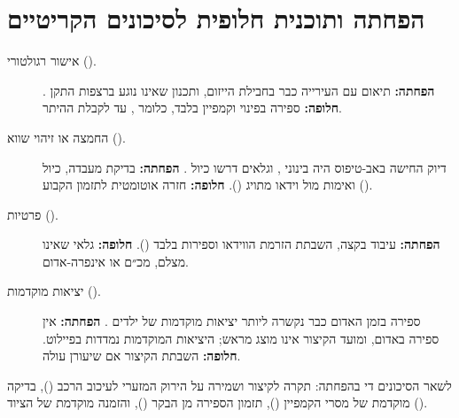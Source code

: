 \section{הפחתה ותוכנית חלופית לסיכונים הקריטיים}
\begin{description}
\item[אישור רגולטורי ().] \textbf{הפחתה:} תיאום עם העירייה כבר בחבילת הייזום, ותכנון שאינו נוגע ברצפות התקן \cite{fhwa2025mutcd}. \textbf{חלופה:} ספירה בפינוי וקמפיין בלבד, כלומר , עד לקבלת ההיתר.
\item[החמצה או זיהוי שווא ().] דיוק החישה באב-טיפוס היה בינוני \cite{wickramasinghe2020}, וגלאים דרשו כיול \cite{hughes2000}. \textbf{הפחתה:} בדיקת מעבדה, כיול ואימות מול וידאו מתויג (). \textbf{חלופה:} חזרה אוטומטית לתזמון הקבוע ().
\item[פרטיות ().] \textbf{הפחתה:} עיבוד בקצה, השבתת הזרמת הווידאו \cite{agd2024agd645} וספירות בלבד (). \textbf{חלופה:} גלאי שאינו מצלם, מכ״ם או אינפרה-אדום.
\item[יציאות מוקדמות ().] ספירה בזמן האדום כבר נקשרה ליותר יציאות מוקדמות של ילדים \cite{fu2016}. \textbf{הפחתה:} אין ספירה באדום, ומועד הקיצור אינו מוצג מראש; היציאות המוקדמות נמדדות בפיילוט. \textbf{חלופה:} השבתת הקיצור אם שיעורן עולה.
\end{description}
לשאר הסיכונים די בהפחתה: תקרה לקיצור ושמירה על הירוק המזערי לעיכוב הרכב (), בדיקה מוקדמת של מסרי הקמפיין (), תזמון הספירה מן הבקר (), והזמנה מוקדמת של הציוד ().
